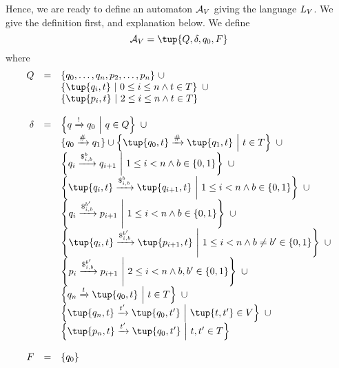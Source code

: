 \documentclass{article}
\begin{document}
Hence, we are ready to define an automaton $\mathcal{A}_V$ giving the language $L_V$.
We give the definition first, and explanation below.
We define
\[
    \cA_\vcons = \tup{Q, \delta, q_0, F}
\]
where
\[
    \begin{array}{rcl}
        Q &=& \set{q_0, \ldots, q_n, p_2, \ldots, p_n} \ \cup \\
          & & \setcomp{\tup{q_i, \tile}}
                      {0 \leq i \leq n \land \tile \in \tiles} \ \cup \\
          & & \setcomp{\tup{p_i, \tile}}
                      {2 \leq i \leq n \land \tile \in \tiles} \\
        \\
        \delta &=& \setcomp{q \xrightarrow{\resetchar} q_0}{q \in Q} \ \cup \\
               & & \set{q_0 \xrightarrow{\rowdelim} q_1} \cup
                   \setcomp{\tup{q_0, \tile}
                            \xrightarrow{\rowdelim}
                            \tup{q_1, \tile}}
                           {\tile \in \tiles} \ \cup \\
               & & \setcomp{q_i
                            \xrightarrow{\repl{i}{\bit}{\bit}}
                            q_{i+1}}
                           {1 \leq i < n \land \bit \in \set{0,1}} \ \cup \\
               & & \setcomp{\tup{q_i, \tile}
                            \xrightarrow{\repl{i}{\bit}{\bit}}
                            \tup{q_{i+1}, \tile}}
                           {1 \leq i < n \land \bit \in \set{0,1}} \ \cup \\
               & & \setcomp{q_i
                            \xrightarrow{\repl{i}{\bit}{\bit'}}
                            p_{i+1}}
                           {1 \leq i < n \land \bit \in \set{0,1}} \ \cup \\
               & & \setcomp{\tup{q_i, \tile}
                            \xrightarrow{\repl{i}{\bit}{\bit'}}
                            \tup{p_{i+1}, \tile}}
                           {1 \leq i < n \land
                            \bit \neq \bit' \in \set{0,1}} \ \cup \\
               & & \setcomp{p_i
                            \xrightarrow{\repl{i}{\bit}{\bit'}}
                            p_{i+1}}
                           {2 \leq i < n \land \bit, \bit' \in \set{0,1}} \ \cup \\
               & & \setcomp{q_n \xrightarrow{\tile} \tup{q_0, \tile}}
                           {\tile \in \tiles} \ \cup \\
               & & \setcomp{\tup{q_n, \tile}
                            \xrightarrow{\tile'}
                            \tup{q_0, \tile'}}
                           {\tup{\tile, \tile'} \in \vcons} \ \cup \\
               & & \setcomp{\tup{p_n, \tile}
                            \xrightarrow{\tile'}
                            \tup{q_0, \tile'}}
                           {\tile, \tile' \in \tiles} \\
        \\
        F &=& \set{q_0}
    \end{array}
\]
\end{document}
